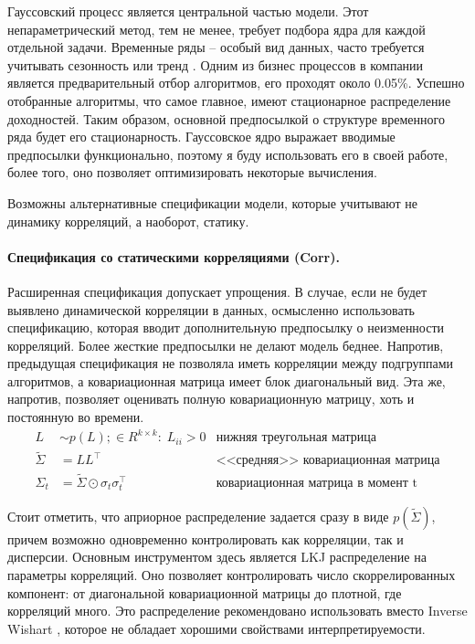 Гауссовский процесс является центральной частью модели. Этот непараметрический метод, тем не менее, требует подбора ядра для каждой отдельной задачи. Временные ряды -- особый вид данных, часто требуется учитывать сезонность или тренд \citep{taylor2017}. Одним из бизнес процессов в компании является предварительный отбор алгоритмов, его проходят около 0.05\%. Успешно отобранные алгоритмы, что самое главное, имеют стационарное распределение доходностей. Таким образом, основной предпосылкой о структуре временного ряда будет его стационарность. Гауссовское ядро выражает вводимые предпосылки функционально, поэтому я буду использовать его в своей работе, более того, оно позволяет оптимизировать некоторые вычисления. 

Возможны альтернативные спецификации модели, которые учитывают не динамику корреляций, а наоборот, статику.
\paragraph{Спецификация со статическими корреляциями (Corr).}
Расширенная спецификация допускает упрощения. В случае, если не будет выявлено динамической корреляции в данных, осмысленно использовать спецификацию, которая вводит дополнительную предпосылку о неизменности корреляций. Более жесткие предпосылки не делают модель беднее. Напротив, предыдущая спецификация не позволяла иметь корреляции между подгруппами алгоритмов, а ковариационная матрица имеет блок диагональный вид. Эта же, напротив, позволяет оценивать полную ковариационную матрицу, хоть и постоянную во времени.
\begin{align}
L &\sim p(L);\in R^{k\times k}:\; L_{ii} > 0 & \text{нижняя треугольная матрица}\nonumber\\
\tilde{\Sigma} &= LL^\top & \text{<<средняя>> ковариационная матрица}\nonumber\\
\Sigma_t &= \tilde{\Sigma} \odot \sigma_t\sigma_t^\top & \text{ковариационная матрица в момент t}\label{eq:staticcorr}
\end{align}

Стоит отметить, что априорное распределение задается сразу в виде $p(\tilde{\Sigma})$, причем возможно одновременно контролировать как корреляции, так и дисперсии. Основным инструментом здесь является LKJ распределение \citep{lewandowski2009} на параметры корреляций. Оно позволяет контролировать число скоррелированных компонент: от диагональной ковариационной матрицы до плотной, где корреляций много. Это распределение рекомендовано использовать вместо Inverse Wishart \citep{haff1979}, которое не обладает хорошими свойствами интерпретируемости. 


